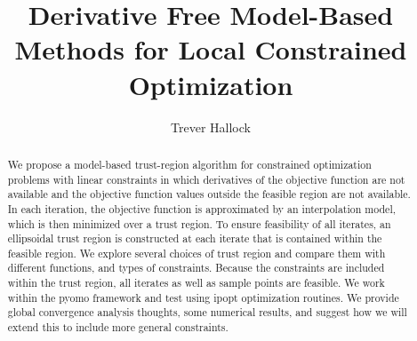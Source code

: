 \documentclass{article}
\title{Derivative Free Model-Based Methods for Local Constrained Optimization}
\author{Trever Hallock}
\begin{document}
\maketitle

\begin{abstract}

We propose a model-based trust-region algorithm for constrained optimization problems with linear constraints in which derivatives of the objective function are not available and the objective function values outside the feasible region are not available.
In each iteration, the objective function is approximated by an interpolation model, which is then minimized over a trust region.
To ensure feasibility of all iterates, an ellipsoidal trust region is constructed at each iterate that is contained within the feasible region.
We explore several choices of trust region and compare them with different functions, and types of constraints.
Because the constraints are included within the trust region, all iterates as well as sample points are feasible.
We work within the pyomo framework and test using ipopt optimization routines. We provide global convergence analysis thoughts, some numerical results, and suggest how we will extend this to include more general constraints.

\end{abstract}

\newpage

\tableofcontents

\newpage

%
%
%
%
%
%
\end{document}
